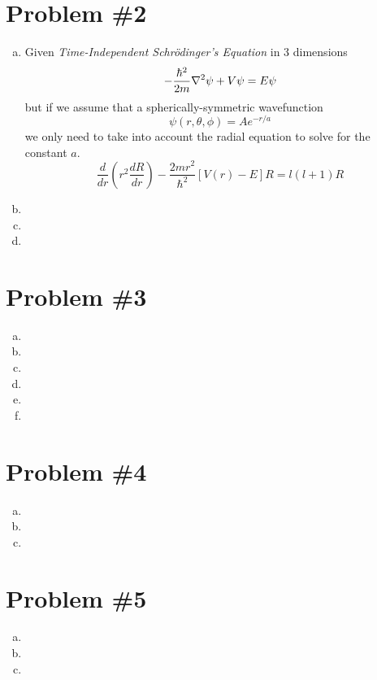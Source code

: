 \documentclass[11pt]{article}
\numberwithin{equation}{section}
\newcommand{\grad}{\bold\nabla}
\begin{document}
\section{Problem \#2}
\begin{enumerate}[(a)]
\item
Given \emph{Time-Independent Schr\"{o}dinger's Equation} in 3 dimensions
$$-\frac{\hbar^2}{2m}\grad^2\psi+V\psi = E\psi$$
but if we assume that a spherically-symmetric wavefunction 
$$\psi(r,\theta,\phi) = Ae^{-r/a}$$
we only need to take into account the radial equation to solve for the constant $a$. 
$$\frac{d}{dr}\left(r^2\frac{dR}{dr}\right)-\frac{2mr^2}{\hbar^2}[V(r)-E]R = l(l+1)R$$

\item
\item
\item
\end{enumerate}

\section{Problem \#3}
\begin{enumerate}[(a)]
\item
\item
\item
\item
\item
\item
\end{enumerate}

\section{Problem \#4}
\begin{enumerate}[(a)]
\item
\item
\item
\end{enumerate}

\section{Problem \#5}
\begin{enumerate}[(a)]
\item
\item
\item
\end{enumerate}
\end{document}
